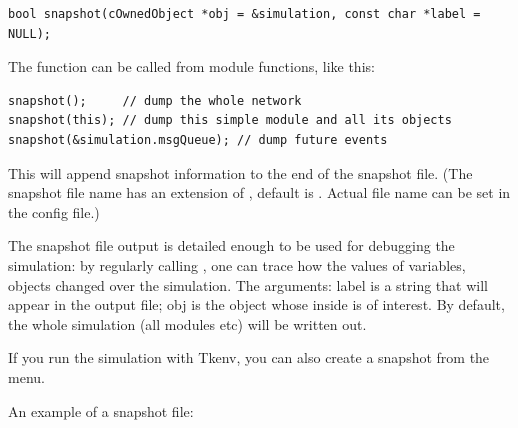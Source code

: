 \begin{verbatim}
bool snapshot(cOwnedObject *obj = &simulation, const char *label = NULL);
\end{verbatim}


The function can be called from module functions, like this:

\begin{verbatim}
snapshot();     // dump the whole network
snapshot(this); // dump this simple module and all its objects
snapshot(&simulation.msgQueue); // dump future events
\end{verbatim}

This will append snapshot information to the end of the snapshot file.
(The snapshot file name has an extension of , default is
. Actual file name can be set in the
config file.)


The snapshot file output is detailed enough to be used for debugging
the simulation: by regularly calling , one can trace
how the values of variables, objects changed over the simulation.
The arguments: label is a string that will appear in the output
file; obj is the object whose inside is of interest. By default,
the whole simulation (all modules etc) will be written out.

If you run the simulation with Tkenv, you can also create a snapshot
from the menu.


An example of a snapshot file:


